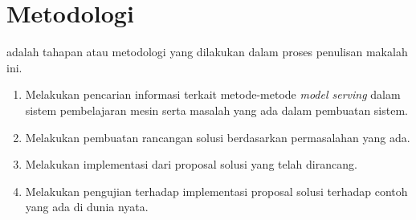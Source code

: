 \section{Metodologi}

adalah tahapan atau metodologi yang dilakukan dalam proses penulisan makalah ini.

\begin{enumerate}
  \item Melakukan pencarian informasi terkait metode-metode \textit{model serving} dalam sistem pembelajaran mesin serta masalah yang ada dalam pembuatan sistem.
  \item Melakukan pembuatan rancangan solusi berdasarkan permasalahan yang ada.
  \item Melakukan implementasi dari proposal solusi yang telah dirancang.
  \item Melakukan pengujian terhadap implementasi proposal solusi terhadap contoh yang ada di dunia nyata.
\end{enumerate}